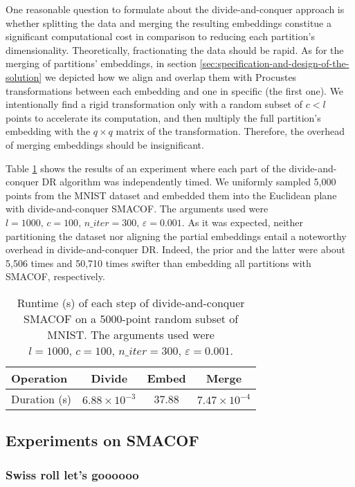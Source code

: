 One reasonable question to formulate about the divide-and-conquer approach is whether splitting the data and merging the resulting embeddings constitue a significant computational cost in comparison to reducing each partition's dimensionality. Theoretically, fractionating the data should be rapid. As for the merging of partitions' embeddings, in section \ref{sec:specification-and-design-of-the-solution} we depicted how we align and overlap them with Procustes transformations between each embedding and one in specific (the first one). We intentionally find a rigid transformation only with a random subset of $c < l$ points to accelerate its computation, and then multiply the full partition's embedding with the $q\times q$ matrix of the transformation. Therefore, the overhead of merging embeddings should be insignificant.

Table \ref{tab:dc-overhead} shows the results of an experiment where each part of the divide-and-conquer DR algorithm was independently timed. We uniformly sampled 5,000 points from the MNIST dataset and embedded them into the Euclidean plane with divide-and-conquer SMACOF. The arguments used were $l=1000,\, c=100,\, n\_iter = 300,\, \varepsilon = 0.001$. As it was expected, neither partitioning the dataset nor aligning the partial embeddings entail a noteworthy overhead in divide-and-conquer DR. Indeed, the prior and the latter were about 5,506 times and 50,710 times swifter than embedding all partitions with SMACOF, respectively.

\begin{table}[ht]
    \centering
    \begin{tabular}{lccc}
        \toprule
        Operation    & Divide & Embed & Merge \\
        \midrule
        Duration (s) & $6.88 \times 10^{-3}$ & 37.88 & $7.47 \times 10^{-4}$ \\
        \bottomrule
    \end{tabular}
    \caption{Runtime (s) of each step of divide-and-conquer SMACOF on a 5000-point random subset of MNIST. The arguments used were $l=1000,\, c=100,\, n\_iter = 300,\, \varepsilon = 0.001$.}
    \label{tab:dc-overhead}
\end{table}

\subsection{Experiments on SMACOF}

\subsubsection{Swiss roll let's goooooo}

